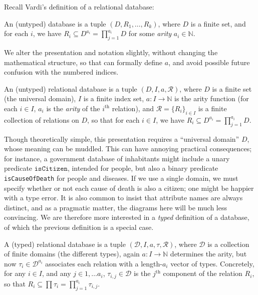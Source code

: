 \documentclass{article}
\theoremstyle{definition}
\theoremstyle{remark}
\begin{document}
Recall Vardi's \cite{vardi} definition of a relational database:
\begin{leftbar}	
\begin{defn*}
    An (untyped) database is a tuple $(D, R_1, \ldots, R_k)$, where $D$ is a finite set, and for each $i$, we have $R_i \subseteq D^{a_i} = \prod_{j =1}^{a_i} D$ 
    for some \emph{arity} $a_i \in \mathbb N$. 
\end{defn*}
\end{leftbar}

We alter the presentation and notation slightly, without changing the mathematical structure, so that can formally define $a$, and avoid possible future confusion with the numbered indices. 

\begin{defn}
    An (untyped) relational database is a tuple $(D, I, a, \mathcal R)$, where $D$ is a
    finite set (the universal domain), $I$ is a finite index set, $a: I \to
    \mathbb N$ is the arity function (for each $i \in I$, $a_i$ is the
    \emph{arity} of the $i^{\text{th}}$ relation), and $\mathcal R = \{R_i\}_{i
    \in I}$ is a finite collection of relations on $D$, so that for each $i \in
    I$, we have $R_i \subseteq D^{a_i} = \prod_{j =1}^{a_i} D$.
\end{defn}

Though theoretically simple, this presentation requires a  ``universal domain'' $D$, whose meaning can be muddled. This can have annoying practical consequences; for instance, a government database of inhabitants might include a unary predicate $\texttt{isCitizen}$, intended for people, but also a binary predicate \texttt{isCauseOfDeath} for people and diseases. If we use a single domain, we must specify whether or not each cause of death is also a citizen; one might be happier with a type error.
It is also common to insist that attribute names are always distinct, and as a pragmatic matter, the diagrams here will be much less convincing. 
%
We are therefore more interested in a \emph{typed} definition of a database, of which the previous definition is a special case.

\begin{defn}
    A (typed) relational database is a tuple $(\mathcal D, I, a, \tau, \mathcal R)$, where
    $\mathcal D$ is a collection of finite domains (the different types), again
    $a: I \to \mathbb N$ determines the arity, but now $\tau_i \in \mathcal
    D^{a_i}$ associates each relation with a length-$a_i$ vector of types. 
    Concretely, for any $i \in I$, and any $j \in 1, \ldots a_i$, $\tau_{i,j}
    \in \mathcal D$ is the $j^{\text{th}}$ component of the relation $R_i$, so
    that  $R_i \subseteq \prod \tau_i = \prod_{j =1}^{a_i} \tau_{i,j}.$
\end{defn}
\end{document}
